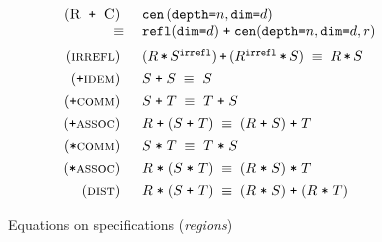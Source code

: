 \documentclass[9pt]{sigplanconf}
\theoremstyle{definition}
\newcommand{\term}[1]{\texttt{#1}}
\newcommand{\stenCenS}[2]{\term{cen} \, (\term{depth=}#1,
  \term{dim=}#2)}
\newcommand{\irreflS}{\texttt{irrefl}}
\newcommand{\stenCenSR}[3]{\term{cen} (\term{depth=}#1,
  \term{dim=}#2, #3)}
\newcommand{\stenReflSR}[1]{\term{refl} (\term{dim=}#1)}
\begin{document}
\begin{figure}
\begin{align*}
\begin{array}{c}
\begin{array}{rll}
%
%
(\textsc{R\, \texttt{+} \,C}) \;\; &
\stenCenS{n}{d} \\
\equiv \; & \stenReflSR{d} \; \texttt{+} \; \stenCenSR{n}{d}{r} \\[0.6em]
%
%
(\textsc{irrefl}) \;\; & (R \, \term{*} \, S^\irreflS) \, \term{+} \,
                         (R^\irreflS \, \term{*} \, S) \;
\equiv \; R \, \term{*} \, S \\[0.4em]
%
%
(\texttt{+}\textsc{idem}) \;\; & S \; \texttt{+} \; S \; \equiv \; S \\[0.4em]
%
(\texttt{+}\textsc{comm}) \;\; & S \; \texttt{+} \; T \; \equiv \; T \;
                       \texttt{+} \; S \\[0.4em]
%
(\texttt{+}\textsc{assoc}) \;\; & R \; \texttt{+} \; (S \; \texttt{+} \; T) \; \equiv \; (R \;
                       \texttt{+} \; S) \; \texttt{+} \; T \\[0.4em]
(\texttt{*}\textsc{comm}) \;\; & S \; \texttt{*} \; T \; \equiv \; T \;
                       \texttt{*} \; S \\[0.4em]
%
(\texttt{*}\textsc{assoc}) \;\; & R \; \texttt{*} \; (S \; \texttt{*} \; T) \; \equiv \; (R \;
                       \texttt{*} \; S) \; \texttt{*} \; T \\[0.4em]
(\textsc{dist}) \;\; & R \; \texttt{*} \; (S \; \texttt{+} \; T) \; \equiv \; (R \;
                       \texttt{*} \; S) \; \texttt{+} \; (R
                       \; \texttt{*} \; T)
\end{array}
%
\end{array}
\end{align*}
\caption{Equations on specifications (\emph{regions})}
\vspace{-1em}
\label{fig:equations}
\end{figure}
\end{document}
